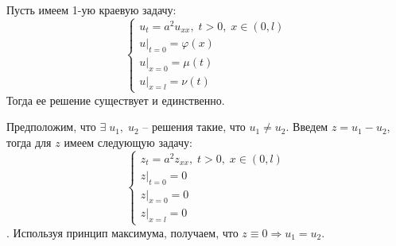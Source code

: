 \begin{conseq}
	Пусть имеем 1-ую краевую задачу:
	$$\begin{cases}
		u_{t} = a^2 u_{xx}, \; t > 0, \; x \in (0, l)\\
		u|_{t = 0} = \varphi (x) \\
		u|_{x = 0} = \mu (t) \\
		u|_{x = l} = \nu (t)
	\end{cases}$$
	Тогда ее решение существует и единственно.
\end{conseq}
\begin{Proof}
Предположим, что $ \exists \; u_1, \; u_2 $ -- решения такие, что $ u_1 \neq u_2.$ Введем $z = u_1 - u_2 $, тогда для $z$ имеем следующую задачу:
$$\begin{cases}
	z_{t} = a^2 z_{xx}, \; t > 0, \; x \in (0, l)\\
	z|_{t = 0} = 0 \\
	z|_{x = 0} = 0 \\
	z|_{x = l} = 0
\end{cases}$$.
Используя принцип максимума, получаем, что $ z \equiv 0 \Longrightarrow u_1 = u_2 $.
\end{Proof}

